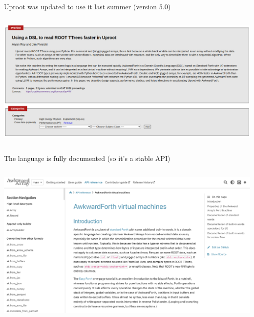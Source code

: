 \documentclass[aspectratio=169]{beamer}
\begin{document}
\begin{frame}{Uproot was updated to use it last summer (version 5.0)}
\vspace{0.6 cm}
\begin{columns}
\includegraphics[width=\linewidth]{PLOTS/AwkwardForth-paper-2.png}
\end{columns}
\end{frame}

\begin{frame}{The language is fully documented (so it's a stable API)}
\vspace{0.17 cm}
\begin{columns}
\includegraphics[width=\linewidth]{PLOTS/AwkwardForth-documentation.png}
\end{columns}
\end{frame}
\end{document}
